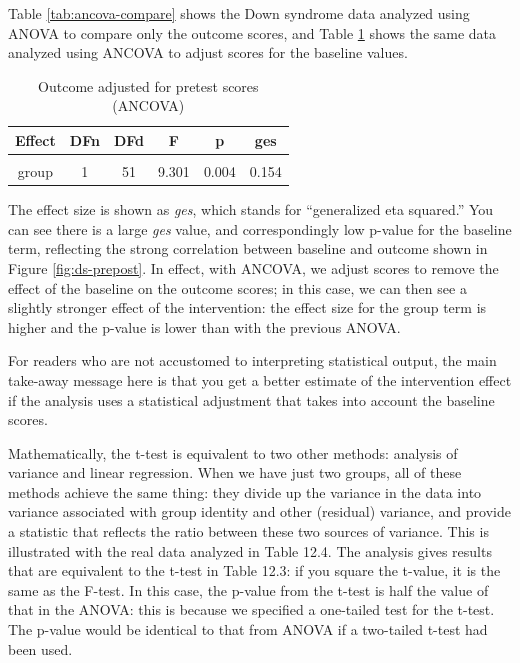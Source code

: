 \documentclass{krantz}
\begin{document}
Table \ref{tab:ancova-compare} shows the Down syndrome data analyzed using ANOVA to compare only the outcome scores, and Table \ref{tab:ancova} shows the same data analyzed using ANCOVA to adjust scores for the baseline values.

\begin{table}

\caption{\label{tab:ancova}Outcome adjusted for pretest scores (ANCOVA)}
\centering
\begin{tabular}[t]{cccccc}
\toprule
Effect & DFn & DFd & F & p & ges\\
\midrule
\cellcolor{gray!6}{baseline} & \cellcolor{gray!6}{1} & \cellcolor{gray!6}{51} & \cellcolor{gray!6}{94.313} & \cellcolor{gray!6}{0.000} & \cellcolor{gray!6}{0.649}\\
group & 1 & 51 & 9.301 & 0.004 & 0.154\\
\bottomrule
\end{tabular}
\end{table}

The effect size is shown as \emph{ges}, which stands for ``generalized eta squared.'' You can see there is a large \emph{ges} value, and correspondingly low p-value for the baseline term, reflecting the strong correlation between baseline and outcome shown in Figure \ref{fig:ds-prepost}. In effect, with ANCOVA, we adjust scores to remove the effect of the baseline on the outcome scores; in this case, we can then see a slightly stronger effect of the intervention: the effect size for the group term is higher and the p-value is lower than with the previous ANOVA.

For readers who are not accustomed to interpreting statistical output, the main take-away message here is that you get a better estimate of the intervention effect if the analysis uses a statistical adjustment that takes into account the baseline scores.

\begin{tcolorbox}[colback=Black!5!lightgray,colframe=black!75!black,coltitle=white,title=Analysis of Variance and Linear Regression]\label{box:ttestcomparison}
Mathematically, the t-test is equivalent to two other methods: analysis of variance and linear regression. When we have just two groups, all of these methods achieve the same thing: they divide up the variance in the data into variance associated with group identity and other (residual) variance, and provide a statistic that reflects the ratio between these two sources of variance. This is illustrated with the real data analyzed in Table 12.4. The analysis gives results that are equivalent to the t-test in Table 12.3: if you square the t-value, it is the same as the F-test. In this case, the p-value from the t-test is half the value of that in the ANOVA: this is because we specified a one-tailed test for the t-test. The p-value would be identical to that from ANOVA if a two-tailed t-test had been used.\
\end{tcolorbox}
\end{document}
